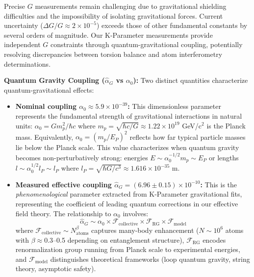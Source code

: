 \documentclass[11pt,a4paper,twoside]{article}
\begin{document}
Precise $G$ measurements remain challenging due to gravitational shielding difficulties and the impossibility of isolating gravitational forces. Current uncertainty ($\Delta G/G \approx 2 \times 10^{-5}$) exceeds those of other fundamental constants by several orders of magnitude. Our K-Parameter measurements provide independent $G$ constraints through quantum-gravitational coupling, potentially resolving discrepancies between torsion balance and atom interferometry determinations.

\textbf{Quantum Gravity Coupling ($\hat{\alpha}_G$ vs $\alpha_0$):} Two distinct quantities characterize quantum-gravitational effects:

\begin{itemize}[leftmargin=*]
\item \textbf{Nominal coupling $\alpha_0 \approx 5.9 \times 10^{-39}$:} This dimensionless parameter represents the fundamental strength of gravitational interactions in natural units: $\alpha_0 = Gm_p^2/\hbar c$ where $m_p = \sqrt{\hbar c/G} \approx 1.22 \times 10^{19}$ GeV/c$^2$ is the Planck mass. Equivalently, $\alpha_0 = (m_p/E_P)^2$ reflects how far typical particle masses lie below the Planck scale. This value characterizes when quantum gravity becomes non-perturbatively strong: energies $E \sim \alpha_0^{-1/2} m_p \sim E_P$ or lengths $l \sim \alpha_0^{1/2} l_P \sim l_P$ where $l_P = \sqrt{\hbar G/c^3} \approx 1.616 \times 10^{-35}$ m.

\item \textbf{Measured effective coupling $\hat{\alpha}_G = (6.96 \pm 0.15) \times 10^{-10}$:} This is the \textit{phenomenological} parameter extracted from K-Parameter gravitational fits, representing the coefficient of leading quantum corrections in our effective field theory. The relationship to $\alpha_0$ involves:
\begin{equation}
\hat{\alpha}_G \sim \alpha_0 \times \mathcal{F}_{\text{collective}} \times \mathcal{F}_{\text{RG}} \times \mathcal{F}_{\text{model}}
\end{equation}
where $\mathcal{F}_{\text{collective}} \sim N_{\text{atoms}}^{\beta}$ captures many-body enhancement ($N \sim 10^6$ atoms with $\beta \approx 0.3$--0.5 depending on entanglement structure), $\mathcal{F}_{\text{RG}}$ encodes renormalization group running from Planck scale to experimental energies, and $\mathcal{F}_{\text{model}}$ distinguishes theoretical frameworks (loop quantum gravity, string theory, asymptotic safety).
\end{itemize}
\end{document}

